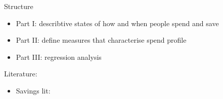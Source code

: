 Structure

\begin{itemize}

    \item Part I: describtive states of how and when people spend and save

    \item Part II: define measures that characterise spend profile

    \item Part III: regression analysis

\end{itemize}


Literature:
\begin{itemize}
    \item Savings lit: \citet{lunt1991psychological, oaten2007improvements, }
\end{itemize}





